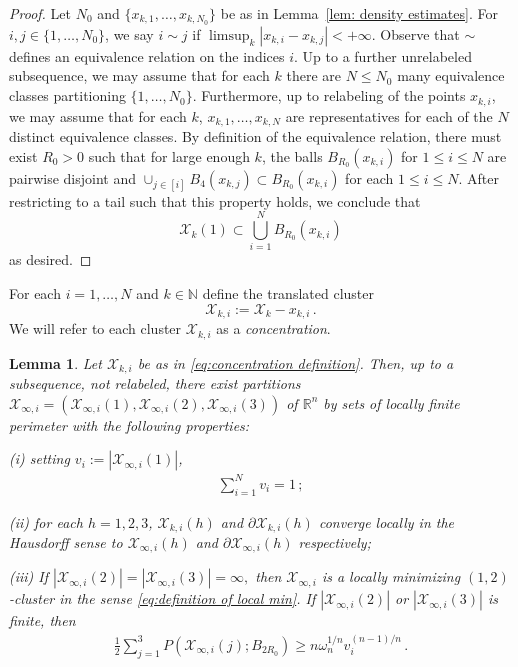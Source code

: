\documentclass[10pt,reqno]{amsart}
\numberwithin{equation}{section}
\newtheorem{lemma}[theorem]{Lemma}
\theoremstyle{definition}
\newcommand{\R}{\mathbb{R}}
\newcommand{\X}{\mathcal{X}}
\begin{document}
{\begin{proof}
    Let $N_0$ and $\{x_{k,1}, \dots, x_{k,N_0}\}$ be as in Lemma~\ref{lem: density estimates}. 
 For $i, j \in \{1, \dots, N_0\}$, we say $i \sim j$ if $\limsup_k |x_{k,i} - x_{k,j}|<+\infty.$ 
 Observe that $\sim$ defines an equivalence relation on the indices $i$. {Up to a further unrelabeled subsequence, we may assume that for each $k$ there are $N\leq N_0$ many equivalence classes partitioning $\{1,\dots, N_0\}$. Furthermore, up to relabeling of the points $x_{k,i}$, we may assume that for each $k$, $x_{k,1},\dots,x_{k,N}$ are representatives for each of the $N$ distinct equivalence classes.} By definition of the equivalence relation, there must exist $R_0>0$ such that {for large enough $k$,} the balls $B_{R_0}(x_{k,i})$ for $1\leq i \leq N$ are pairwise disjoint and 
 $\cup_{j \in [i]} {B_4}(x_{k,j}) \subset B_{R_0}(x_{k,i})$ for each $1\leq i \leq N$. After restricting to a tail such that this property holds, we conclude that
 \[
 \X_k(1) \subset \bigcup_{i = 1}^N B_{R_0}(x_{k,i})
\]
as desired. 
\end{proof}




For each $i =1,\dots , N$ and $k \in \mathbb{N}$ define the translated cluster
\begin{equation}\label{eq:concentration definition}
    \X_{k,i} := \X_{k} - x_{k,{i}}\,.
\end{equation}
 We will refer to each cluster $\X_{k,i}$ as a {\it concentration}. 



 \begin{lemma}\label{lem: limit local min}
     Let $\X_{k,i}$ be as in \eqref{eq:concentration definition}. Then, up to a subsequence, not relabeled, there exist partitions $\X_{\infty,i}= (\X_{\infty,i}(1), \X_{\infty, i}(2), \X_{\infty, i}(3))$ {of $\R^n$} by sets of locally finite perimeter with the following properties:

\smallskip

\noindent (i) setting $v_i:=|\X_{\infty,i}(1)|$,
\begin{align}\label{eq:vi sum to 1}
    \sum_{i=1}^N v_i = 1\,;
 \end{align}

\noindent (ii) for each $h=1,2,3$, $\X_{k,i}(h)$ and $\partial \X_{k,i}(h)$ converge locally in the Hausdorff sense to $\X_{\infty,i}(h)$ {and $\partial \X_{\infty,i}(h)$ respectively};

\noindent (iii) {
If $|\X_{\infty,i}(2)|= |\X_{\infty,i}(3)|=\infty,$} then $\X_{\infty,i}$ is a locally minimizing $(1,2)$-cluster in the sense \eqref{eq:definition of local min}.   
%
{If $|\X_{\infty,i}(2)|$ or $|\X_{\infty,i}(3)|$ is finite, then 
\begin{align}\label{eq:floater lower bound}
    \frac{1}{2}\sum_{j=1}^3 P(\X_{\infty,i}(j);B_{2R_0}) \geq n\omega_n^{1/n} v_i^{(n-1)/n}\,.
\end{align}
}
\end{lemma}

}
\end{document}
